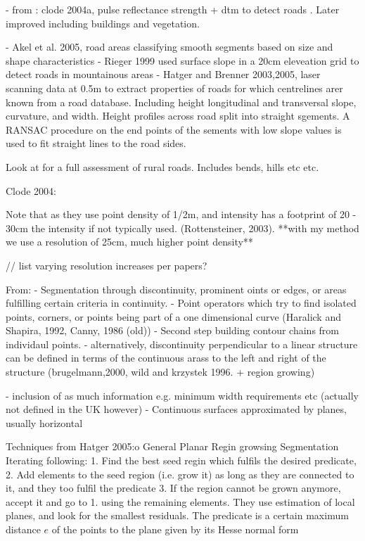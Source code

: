 \begin{multicols}{2}
- from \citep{vosselman2009a}: clode 2004a, pulse reflectance strength + dtm to detect roads . Later improved including buildings and vegetation.

- Akel et al. 2005, road areas classifying smooth segments based on size and shape characteristics
- Rieger 1999 used surface slope in a 20cm eleveation grid to detect roads in mountainous areas
- Hatger and Brenner 2003,2005, laser scanning data at 0.5m to extract properties of roads for which centrelines arer known from a road database. Including height longitudinal and transversal slope, curvature, and width. Height profiles across road split into straight sgements. A RANSAC procedure on the end points of the sements with low slope values is used to fit straight lines to the road sides. \citep{hatger2003;hatger2005}

Look at \citep{taylor2002} for a full assessment of rural roads. Includes bends, hills etc etc.

Clode 2004:

Note that as they use point density of 1/2m, and intensity has a footprint of 20 - 30cm the intensity if not typically used. (Rottensteiner, 2003). **with my method we use a resolution of 25cm, much higher point density**


// list varying resolution increases per papers?

From: \citep{hatger2005}
- Segmentation through discontinuity, prominent oints or edges, or areas fulfilling certain criteria in continuity.
- Point operators which try to find isolated points, corners, or points being part of a one dimensional curve (Haralick and Shapira, 1992, Canny, 1986 (old))
- Second step building contour chains from individaul points.
- alternatively, discontinuity perpendicular to a linear structure can be defined in terms of the continuous arass to the left and right of the structure (brugelmann,2000, wild and krzystek 1996. + region growing)

- inclusion of as much information e.g. minimum width requirements etc (actually not defined in the UK however)
- Continuous surfaces approximated by planes, usually horizontal

Techniques from Hatger 2005:o
General Planar Regin growsing Segmentation
Iterating following:
1. Find the best seed regin which fulfils the desired predicate,
2. Add elements to the seed region (i.e. grow it) as long as they are connected to it, and they too fulfil the predicate
3. If the region cannot be grown anymore, accept it and go to 1. using the remaining elements.
They use estimation of local planes, and look for the smallest residuals. The predicate is a certain maximum distance $e$ of the points to the plane given by its Hesse normal form


\end{multicols}
